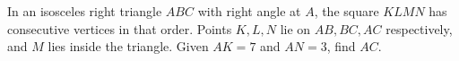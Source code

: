 In an isosceles right triangle $ABC$ with right angle at $A$, the square $KLMN$ has consecutive vertices in that order. Points $K,L,N$ lie on $AB,BC,AC$ respectively, and $M$ lies inside the triangle. Given $AK=7$ and $AN=3$, find $AC$.
